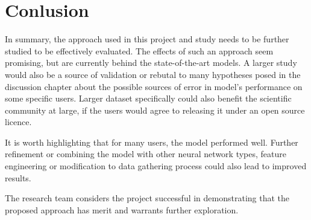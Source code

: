 
\chapter{Conlusion}

In summary, the approach used in this project and study needs to be further studied to be effectively evaluated. The effects of such an approach seem promising, but are currently behind the state-of-the-art models. A larger study would also be a source of validation or rebutal to many hypotheses posed in the discussion chapter about the possible sources of error in model's performance on some specific users. Larger dataset specifically could also benefit the scientific community at large, if the users would agree to releasing it under an open source licence.

It is worth highlighting that for many users, the model performed well. Further refinement or combining the model with other neural network types, feature engineering or modification to data gathering process could also lead to improved results.

The research team considers the project successful in demonstrating that the proposed approach has merit and warrants further exploration.